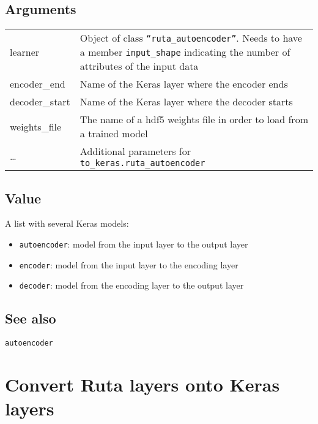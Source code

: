 \hypertarget{arguments}{\subsection{\texorpdfstring{\protect\hyperlink{arguments}{}Arguments}{Arguments}}\label{arguments}}

\begin{longtable}[c]{@{}>{\small}p{3cm}>{\raggedright}p{12.5cm}@{}}
\toprule
learner & Object of class \texttt{``ruta\_autoencoder''}. Needs to have a
member \texttt{input\_shape} indicating the number of attributes of the
input data\tabularnewline
encoder\_end & Name of the Keras layer where the encoder
ends\tabularnewline
decoder\_start & Name of the Keras layer where the decoder
starts\tabularnewline
weights\_file & The name of a hdf5 weights file in order to load from a
trained model\tabularnewline
\ldots{} & Additional parameters for
\texttt{to\_keras.ruta\_autoencoder}\tabularnewline
\bottomrule
\end{longtable}

\hypertarget{value}{\subsection{\texorpdfstring{\protect\hyperlink{value}{}Value}{Value}}\label{value}}

A list with several Keras models:

\begin{itemize}
\item
  \texttt{autoencoder}: model from the input layer to the output layer
\item
  \texttt{encoder}: model from the input layer to the encoding layer
\item
  \texttt{decoder}: model from the encoding layer to the output layer
\end{itemize}

\hypertarget{see-also}{\subsection{\texorpdfstring{\protect\hyperlink{see-also}{}See
also}{See also}}\label{see-also}}

\texttt{autoencoder}

\section{Convert Ruta layers onto Keras
layers}\label{convert-ruta-layers-onto-keras-layers}

